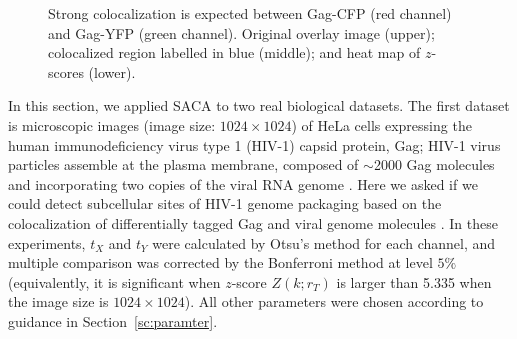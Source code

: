 \documentclass[10pt,twocolumn,twoside]{IEEEtran}
\begin{document}
\begin{figure}[h!]
    \centering
    \caption{Strong colocalization is expected between Gag-CFP (red channel) and Gag-YFP (green channel). Original overlay image (upper); colocalized region labelled in blue (middle); and heat map of $z$-scores (lower).}\label{fg:realdatacpcol}
\end{figure}

In this section, we applied SACA to two real biological datasets. The first dataset is microscopic images (image size: $1024\times 1024$) of HeLa cells expressing the human immunodeficiency virus type 1 (HIV-1) capsid protein, Gag; HIV-1 virus particles assemble at the plasma membrane, composed of $\sim$2000 Gag molecules and incorporating two copies of the viral RNA genome \citep[see][]{sundquist2012,freed2015}. Here we asked if we could detect subcellular sites of HIV-1 genome packaging based on the colocalization of differentially tagged Gag and viral genome molecules \cite[see][]{Jouvenet2009,Chen2009,Pocock2016}. In these experiments, $t_X$ and $t_Y$ were calculated by Otsu's method for each channel, and multiple comparison was corrected by the Bonferroni method at level $5\%$ (equivalently, it is significant when $z$-score $Z(k;r_T)$ is larger than 5.335 when the image size is $1024\times 1024$). All other parameters were chosen according to guidance in Section~\ref{sc:paramter}.
\end{document}
